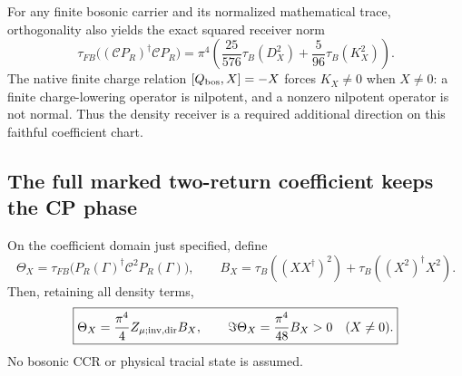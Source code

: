 \documentclass[12pt,a4paper]{article}
\begin{document}
For any finite bosonic carrier and its normalized mathematical trace,
orthogonality also yields the exact squared receiver norm
\begin{equation}
 \tau_{FB}\bigl((\mathcal CP_R)^\dagger\mathcal CP_R\bigr)
 =\pi^4\left(\frac{25}{576}\tau_B(D_X^2)
                 +\frac5{96}\tau_B(K_X^2)\right).
 \label{p5c:v2171:eq:fullreceivernorm}
\end{equation}
The native finite charge relation $[Q_{\rm bos},X]=-X$ forces $K_X\ne0$ when
$X\ne0$: a finite charge-lowering operator is nilpotent, and a nonzero
nilpotent operator is not normal. Thus the density receiver is a required
additional direction on this faithful coefficient chart.

\subsection{The full marked two-return coefficient keeps the CP phase}
\begin{theorem}
\label{p5c:v2171:thm:markedmixed}
On the coefficient domain just specified, define
\[
 \Theta_X=\tau_{FB}\bigl(P_R(\Gamma)^\dagger
                              \mathcal C^2P_R(\Gamma)\bigr),\qquad
 B_X=\tau_B((XX^\dagger)^2)+\tau_B((X^2)^\dagger X^2).
\]
Then, retaining all density terms,
\begin{equation}
 \boxed{\Theta_X=\frac{\pi^4}{4}Z_{\mu;\rm inv,dir}B_X,\qquad
             \Im\Theta_X=\frac{\pi^4}{48}B_X>0\quad(X\ne0).}
 \label{p5c:v2171:eq:positivecp}
\end{equation}
No bosonic CCR or physical tracial state is assumed.
\end{theorem}
\end{document}
